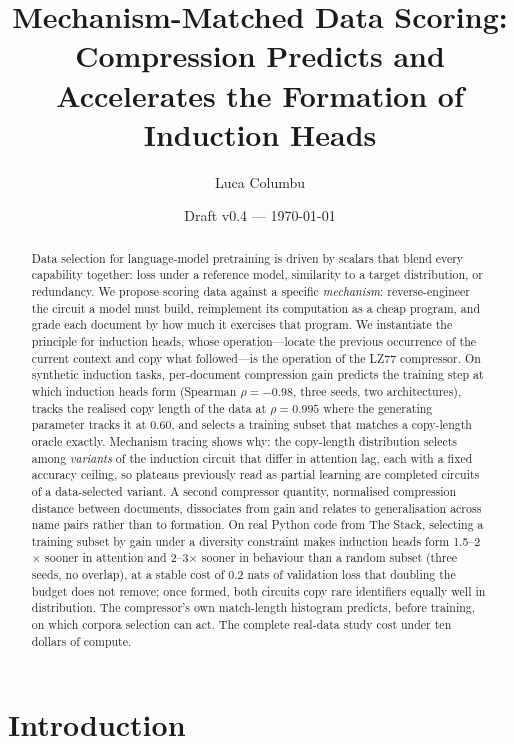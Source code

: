 \documentclass[11pt]{article}
\title{Mechanism-Matched Data Scoring:\\
Compression Predicts and Accelerates the Formation of Induction Heads}
\author{Luca Columbu}
\date{Draft v0.4 --- \today}
\begin{document}
\maketitle

\begin{abstract}
Data selection for language-model pretraining is driven by scalars that
blend every capability together: loss under a reference model, similarity to
a target distribution, or redundancy. We propose scoring data against a
specific \emph{mechanism}: reverse-engineer the circuit a model must build,
reimplement its computation as a cheap program, and grade each document by
how much it exercises that program. We instantiate the principle for
induction heads, whose operation---locate the previous occurrence of the
current context and copy what followed---is the operation of the LZ77
compressor. On synthetic induction tasks, per-document compression gain
predicts the training step at which induction heads form
(Spearman $\rho=-0.98$, three seeds, two architectures), tracks the realised
copy length of the data at $\rho=0.995$ where the generating parameter
tracks it at $0.60$, and selects a training subset that matches a
copy-length oracle exactly. Mechanism tracing shows why: the copy-length
distribution selects among \emph{variants} of the induction circuit that
differ in attention lag, each with a fixed accuracy ceiling, so plateaus
previously read as partial learning are completed circuits of a
data-selected variant. A second compressor quantity, normalised compression
distance between documents, dissociates from gain and relates to
generalisation across name pairs rather than to formation. On real Python
code from The Stack, selecting a training subset by gain under a diversity
constraint makes induction heads form 1.5--2$\times$ sooner in attention and
2--3$\times$ sooner in behaviour than a random subset (three seeds, no
overlap), at a stable cost of 0.2 nats of validation loss that doubling the
budget does not remove; once formed, both circuits copy rare identifiers
equally well in distribution. The compressor's own match-length histogram
predicts, before training, on which corpora selection can act. The complete
real-data study cost under ten dollars of compute.
\end{abstract}

\section{Introduction}
\end{document}
